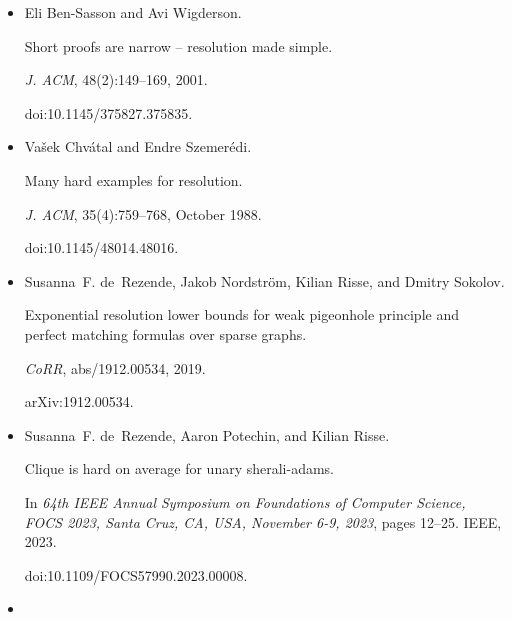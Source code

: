 \begin{itemize}
In \emph{40th Annual Symposium on Foundations of Computer Science,
FOCS ’99, 17-18 October, 1999, New York, NY, USA}, pages 415–421. IEEE
Computer Society, 1999.


doi:10.1109/SFFCS.1999.814613.





\item[] 
[14]

Eli Ben-Sasson and Avi Wigderson.


Short proofs are narrow – resolution made simple.


\emph{J. ACM}, 48(2):149–169, 2001.


doi:10.1145/375827.375835.





\item[] 
[15]

Vašek Chvátal and Endre Szemerédi.


Many hard examples for resolution.


\emph{J. ACM}, 35(4):759–768, October 1988.


doi:10.1145/48014.48016.





\item[] 
[16]

Susanna F. de Rezende, Jakob Nordström, Kilian Risse, and Dmitry Sokolov.


Exponential resolution lower bounds for weak pigeonhole principle and
perfect matching formulas over sparse graphs.


\emph{CoRR}, abs/1912.00534, 2019.


arXiv:1912.00534.





\item[] 
[17]

Susanna F. de Rezende, Aaron Potechin, and Kilian Risse.


Clique is hard on average for unary sherali-adams.


In \emph{64th IEEE Annual Symposium on Foundations of Computer
Science, FOCS 2023, Santa Cruz, CA, USA, November 6-9, 2023}, pages 12–25.
IEEE, 2023.


doi:10.1109/FOCS57990.2023.00008.





\item[] 
[18]


\end{itemize}
